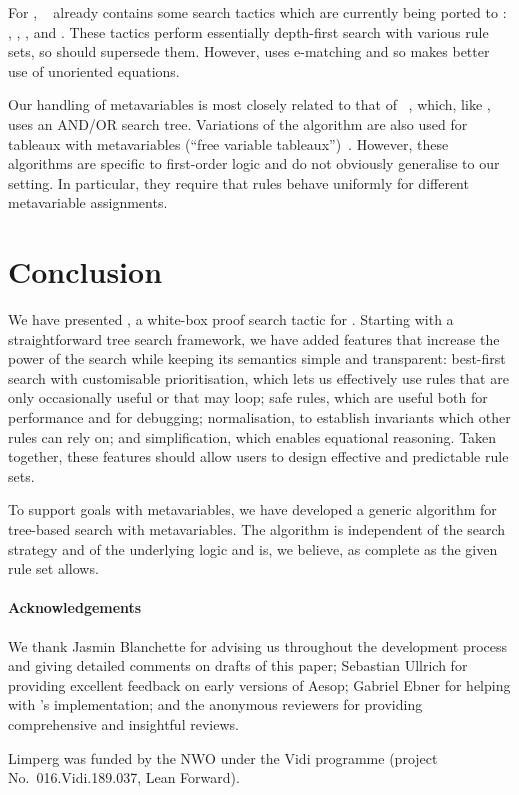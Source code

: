 For \Leanthree, \mathlib~\cite{mathlib} already contains some search tactics
which are currently being ported to \Leanfour: \continuity{}, \measurability{},
\tidy{}, \tautology{} and \finish. These tactics perform essentially depth-first
search with various rule sets, so \Aesop{} should supersede them. However,
\finish{} uses e-matching and so makes better use of unoriented equations.

Our handling of metavariables is most closely related to that of
\Theorema~\cite{Konev05}, which, like \Aesop, uses an AND/OR search tree.
Variations of the \Theorema{} algorithm are also used for tableaux with
metavariables (\enquote{free variable tableaux})~\cite{Giese01}. However, these
algorithms are specific to first-order logic and do not obviously generalise to
our setting. In particular, they require that rules behave uniformly for
different metavariable assignments.


\section{Conclusion}%
\label{sec:conclusion}

We have presented \Aesop{}, a white-box proof search tactic for \Lean. Starting
with a straightforward tree search framework, we have added features that
increase the power of the search while keeping its semantics simple and
transparent: best-first search with customisable prioritisation, which lets us
effectively use rules that are only occasionally useful or that may loop; safe
rules, which are useful both for performance and for debugging; normalisation,
to establish invariants which other rules can rely on; and simplification, which
enables equational reasoning. Taken together, these features should allow users
to design effective and predictable rule sets.

To support goals with metavariables, we have developed a generic algorithm for
tree-based search with metavariables. The algorithm is independent of the search
strategy and of the underlying logic and is, we believe, as complete as the
given rule set allows.


\paragraph{Acknowledgements}
We thank Jasmin Blanchette for advising us throughout the development process
and giving detailed comments on drafts of this paper; Sebastian Ullrich for
providing excellent feedback on early versions of Aesop; Gabriel Ebner for
helping with \Aesop's implementation; and the anonymous reviewers for
providing comprehensive and insightful reviews.

Limperg was funded by the NWO under the Vidi programme (project No.~016.Vidi.189.037, Lean Forward).
